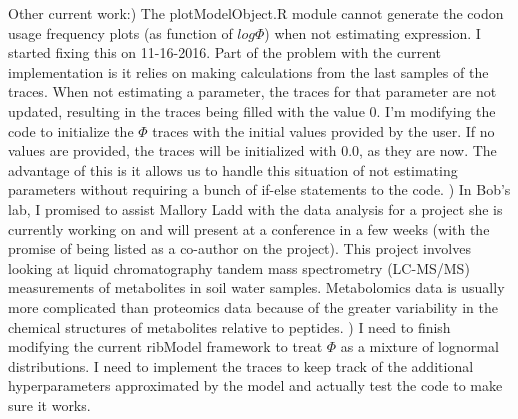\documentclass[11pt]{labbook}
\begin{document}
Other current work:) The plotModelObject.R module cannot generate the codon usage frequency plots (as function of $log\Phi$) when not estimating expression. I started fixing this on 11-16-2016. Part of the problem with the current implementation is it relies on making calculations from the last samples of the traces. When not estimating a parameter, the traces for that parameter are not updated, resulting in the traces being filled with the value 0. I'm modifying the code to initialize the $\Phi$ traces with the initial values provided by the user. If no values are provided, the traces will be initialized with 0.0, as they are now. The advantage of this is it allows us to handle this situation of not estimating parameters without requiring a bunch of if-else statements to the code.
) In Bob's lab, I promised to assist Mallory Ladd with the data analysis for a project she is currently working on and will present at a conference in a few weeks (with the promise of being listed as a co-author on the project). This project involves looking at liquid chromatography tandem mass spectrometry (LC-MS/MS) measurements of metabolites in soil water samples. Metabolomics data is usually more complicated than proteomics data because of the greater variability in the chemical structures of metabolites relative to peptides. 
) I need to finish modifying the current ribModel framework to treat $\Phi$ as a mixture of lognormal distributions. I need to implement the traces to keep track of the additional hyperparameters approximated by the model and actually test the code to make sure it works. \newline \newline
\end{document}
